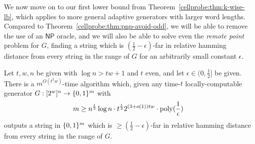 We now move on to our first lower bound from Theorem~\ref{cellprobe:thm:k-wise-lb}, which applies to more general adaptive generators with larger word lengths. Compared to Theorem~\ref{cellprobe:thm:pnp-avoid-odd}, we will be able to remove the use of an $\mathsf{NP}$ oracle, and we will also be able to solve even the \emph{remote point} problem for $G$, finding a string which is $(\frac{1}{2} -\epsilon)$-far in relative hamming distance from every string in the range of $G$ for an arbitrarily small constant $\epsilon$.
\begin{theorem*}
Let $t,w,n$ be given with $\log n > tw+1$ and $t$ even, and let $\epsilon \in (0,\frac{1}{2}]$ be given. There is a $m^{O(t^2 w)}$-time algorithm which, given any time-$t$ locally-computable generator $G: [2^w]^n \to \{0,1\}^m$ with
\[
m \geq  n^{\frac{t}{2}} \log n \cdot t^{\frac{t}{2}}2^{(3+o(1))tw} \cdot \mathrm{poly}(\frac{1}{\epsilon})
\]
outputs a string in $\{0,1\}^m$ which is $\geq (\frac{1}{2}-\epsilon)$-far in relative hamming distance from every string in the range of $G$.
\end{theorem*}

